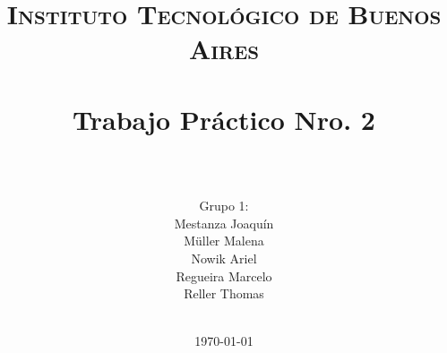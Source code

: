 









\title{
	\normalfont \normalsize \textsc{Instituto Tecnológico de Buenos Aires} \\ [25pt]
	\horrule{2pt} \\[0.4cm]
	\huge Trabajo Pr\'actico Nro. 2\\
	\horrule{2pt} \\[0cm]
\author{Grupo 1:\\Mestanza Joaqu\'in\\ Müller Malena\\Nowik Ariel\\ Regueira Marcelo \\Reller Thomas\\ \\ }
}
\date{\today} %

\maketitle
\newpage




